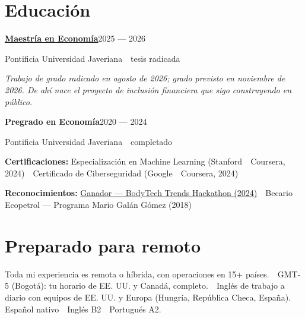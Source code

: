 \documentclass[a4paper,10pt]{article}
\newcommand{\headline}[2]{\needspace{3\baselineskip}\textbf{\color{ink}#1}\hfill{\small #2}\par}
\begin{document}
\section*{Educación}
\headline{\href{https://davirson.com/es/research/fintech-inclusion}{Maestría en Economía}}{2025 --- 2026}
{\small Pontificia Universidad Javeriana \,\textperiodcentered\, tesis radicada}\par
{\small\itshape Trabajo de grado radicado en agosto de 2026; grado previsto en noviembre de 2026. De ahí nace el proyecto de inclusión financiera que sigo construyendo en público.}\par
\vspace{1pt}
\headline{Pregrado en Economía}{2020 --- 2024}
{\small Pontificia Universidad Javeriana \,\textperiodcentered\, completado}\par
\vspace{1pt}
\vspace{3pt}
\textbf{\color{ink}Certificaciones:} Especialización en Machine Learning (Stanford \,\textperiodcentered\, Coursera, 2024) \,\textperiodcentered\, Certificado de Ciberseguridad (Google \,\textperiodcentered\, Coursera, 2024)\par\vspace{3pt}
\textbf{\color{ink}Reconocimientos:} \href{https://public.tableau.com/app/profile/davirson.novoa/viz/BodyTrendsADataAnalysisProject/TrendsAnalysis}{Ganador --- BodyTech Trends Hackathon (2024)} \,\textperiodcentered\, Becario Ecopetrol --- Programa Mario Galán Gómez (2018)\par

\section*{Preparado para remoto}
Toda mi experiencia es remota o híbrida, con operaciones en 15+ países. \,\textperiodcentered\, GMT-5 (Bogotá): tu horario de EE. UU. y Canadá, completo. \,\textperiodcentered\, Inglés de trabajo a diario con equipos de EE. UU. y Europa (Hungría, República Checa, España). \,\textperiodcentered\, Español nativo \,\textperiodcentered\, Inglés B2 \,\textperiodcentered\, Portugués A2.
\end{document}
